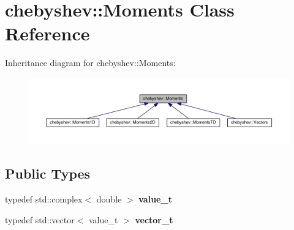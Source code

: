 \hypertarget{classchebyshev_1_1_moments}{}\section{chebyshev\+:\+:Moments Class Reference}
\label{classchebyshev_1_1_moments}


Inheritance diagram for chebyshev\+:\+:Moments\+:\nopagebreak
\begin{figure}[H]
\begin{center}
\leavevmode
\includegraphics[width=350pt]{classchebyshev_1_1_moments__inherit__graph}
\end{center}
\end{figure}
\subsection*{Public Types}
\begin{DoxyCompactItemize}
\item 
typedef std\+::complex$<$ double $>$ {\bfseries value\+\_\+t}\hypertarget{classchebyshev_1_1_moments_a23e4a9b2eebf82d5fc6c849327cbd3d8}{}\label{classchebyshev_1_1_moments_a23e4a9b2eebf82d5fc6c849327cbd3d8}

\item 
typedef std\+::vector$<$ value\+\_\+t $>$ {\bfseries vector\+\_\+t}\hypertarget{classchebyshev_1_1_moments_a711a270332e05270a18a6a186ce00657}{}\label{classchebyshev_1_1_moments_a711a270332e05270a18a6a186ce00657}

\end{DoxyCompactItemize}
